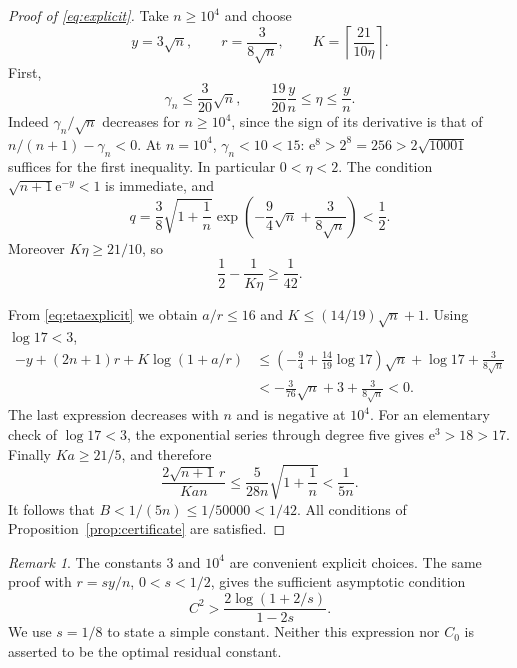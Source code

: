 \documentclass[11pt]{article}
\theoremstyle{remark}\newtheorem{remark}[theorem]{Remark}
\newcommand{\ee}{\mathrm e}
\begin{document}
\begin{proof}[Proof of \eqref{eq:explicit}]
Take \(n\ge10^4\) and choose
\[
 y=3\sqrt n,\qquad r=\frac3{8\sqrt n},\qquad
 K=\left\lceil\frac{21}{10\eta}\right\rceil.
\]
First,
\begin{equation}\label{eq:etaexplicit}
 \gamma_n\le\frac3{20}\sqrt n,\qquad
 \frac{19}{20}\frac yn\le\eta\le\frac yn.
\end{equation}
Indeed \(\gamma_n/\sqrt n\) decreases for \(n\ge10^4\), since the
sign of its derivative is that of \(n/(n+1)-\gamma_n<0\).
At \(n=10^4\), \(\gamma_n<10<15\):
\(\ee^8>2^8=256>2\sqrt{10001}\) suffices for the first inequality.
In particular \(0<\eta<2\).
The condition \(\sqrt{n+1}\ee^{-y}<1\) is immediate, and
\[
 q=\frac38\sqrt{1+\frac1n}
       \exp\left(-\frac94\sqrt n+\frac3{8\sqrt n}\right)<\frac12.
\]
Moreover \(K\eta\ge21/10\), so
\[
 \frac12-\frac1{K\eta}\ge\frac1{42}.
\]

From \eqref{eq:etaexplicit} we obtain \(a/r\le16\) and
\(K\le(14/19)\sqrt n+1\). Using \(\log17<3\),
\begin{align*}
 -y+(2n+1)r+K\log(1+a/r)
 &\le\left(-\frac94+\frac{14}{19}\log17\right)\sqrt n
        +\log17+\frac3{8\sqrt n}\\
 &<-\frac3{76}\sqrt n+3+\frac3{8\sqrt n}<0.
\end{align*}
The last expression decreases with \(n\) and is negative at \(10^4\).
For an elementary check of \(\log17<3\), the exponential series
through degree five gives \(\ee^3>18>17\).
Finally \(Ka\ge21/5\), and therefore
\[
 \frac{2\sqrt{n+1}\,r}{Kan}
 \le\frac5{28n}\sqrt{1+\frac1n}<\frac1{5n}.
\]
It follows that \(B<1/(5n)\le1/50000<1/42\).
All conditions of Proposition~\ref{prop:certificate} are satisfied.
\end{proof}

\begin{remark}
The constants \(3\) and \(10^4\) are convenient explicit choices.
The same proof with \(r=sy/n\), \(0<s<1/2\), gives the sufficient
asymptotic condition
\[
 C^2>\frac{2\log(1+2/s)}{1-2s}.
\]
We use \(s=1/8\) to state a simple constant. Neither this expression
nor \(C_0\) is asserted to be the optimal residual constant.
\end{remark}
\end{document}

